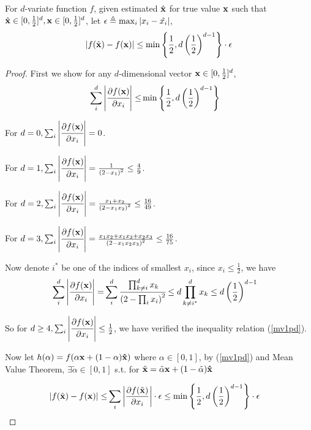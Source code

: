 	\begin{lemma}
		\label{meanvalue1}
		For $d$-variate function $f$, given estimated $\hat{\bf x}$ for true value ${\bf x}$ such that $\hat{\bf x} \in  [0, \frac{1}{2}]^d, {\bf x} \in [0, \frac{1}{2}]^d$, let $\epsilon \triangleq \max_i{\left\vert x_i - \hat{x_i}\right\vert}$,
		\begin{align*}
			\left\vert f(\hat{\bf x}) - f({\bf x})\right\vert
		\leq  \min{\left\{\frac{1}{2}, d \left( \frac{1}{2} \right)^{d-1}\right\}} \cdot \epsilon
		\end{align*}
	\end{lemma}

	\begin{proof}
        First we show for any $d$-dimensional vector ${\bf x} \in [0, \frac{1}{2}]^d$,
        \begin{align}
			\label{mv1pd}
			\sum_i^d \left\vert\cfrac{\partial f({\bf x})}{\partial x_i}\right\vert \leq & \min{\left\{\frac{1}{2}, d \left( \frac{1}{2} \right)^{d-1}\right\}}
		\end{align}

    	For $d=0, \sum_i\left\vert \cfrac{\partial f({\bf x})}{\partial x_i}\right\vert = 0$.

    	For $d=1, \sum_i\left\vert \cfrac{\partial f({\bf x})}{\partial x_i}\right\vert = \frac{1}{\left( 2 - x_1 \right)^2} \leq \frac{4}{9} $.

    	For $d=2, \sum_i\left\vert \cfrac{\partial f({\bf x})}{\partial x_i}\right\vert = \frac{x_1 + x_2}{\left( 2 - x_1x_2 \right)^2} \leq \frac{16}{49} $.

    	For $d=3, \sum_i\left\vert \cfrac{\partial f({\bf x})}{\partial x_i}\right\vert = \frac{x_1 x_2 + x_1 x_3 + x_2 x_3}{\left( 2 - x_1x_2x_3 \right)^2} \leq \frac{16}{75} $.

		Now denote $i^*$ be one of the indices of smallest $x_i$, since $x_i \leq \frac{1}{2}$, we have
    	\begin{align*}
    		\sum_i^d \left\vert\cfrac{\partial f({\bf x})}{\partial x_i}\right\vert  =& \sum_i^d \cfrac{ \prod_{k \neq i}^d x_k  }{\left( 2 - \prod_i x_i \right)^2}
    		\leq  d \prod_{k \neq i^*}^d x_k
    		\leq  d \left( \frac{1}{2} \right)^{d-1}
    	\end{align*}

		So for $d \geq 4, \sum_i \left\vert\cfrac{\partial f({\bf x})}{\partial x_i}\right\vert \leq \frac{1}{2}$, we have verified the inequality relation (\ref{mv1pd}).

        Now let $h(\alpha) = f(\alpha {\bf x} + (1 - \alpha) {\bf \hat{x}})$ where $\alpha \in [0,1]$, by (\ref{mv1pd}) and Mean Value Theorem, $\exists \tilde{\alpha} \in [0,1]$ s.t. for $\tilde{\bf x} = \tilde{\alpha} {\bf x} + (1 - \tilde{\alpha}) {\bf \hat{x}}$

		\begin{align*}
			\left\vert f(\hat{\bf x}) - f({\bf x})\right\vert \leq& \sum_i\left\vert \frac{\partial f(\tilde{\bf x})}{\partial x_i}\right\vert \cdot \epsilon
		\leq  \min{\left\{\frac{1}{2}, d \left( \frac{1}{2} \right)^{d-1}\right\}} \cdot \epsilon
		\end{align*}
	\end{proof}

